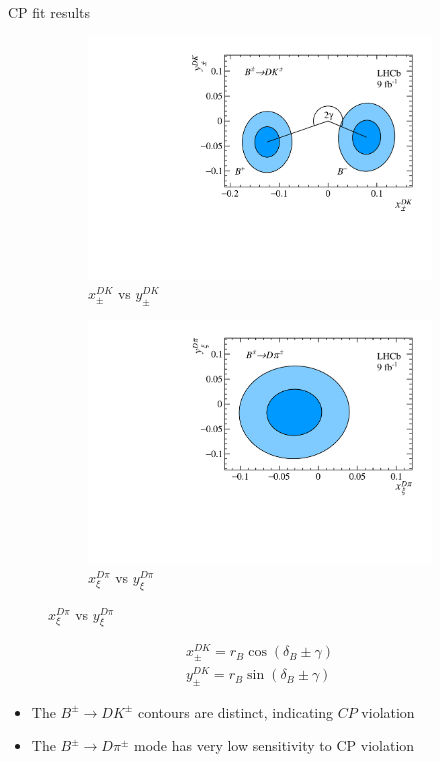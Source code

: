 \documentclass{beamer}
\begin{document}
\begin{frame}{CP fit results}
  \begin{figure}
    \centering
    \vspace{-0.2cm}
    \begin{subfigure}{0.5\textwidth}
      \includegraphics[width = 1.0\textwidth]{Plots/B2DK_CP_Observables_Contours.pdf}
      \caption{$x_\pm^{DK}$ vs $y_\pm^{DK}$}
    \end{subfigure}%
    \begin{subfigure}{0.5\textwidth}
      \includegraphics[width = 1.0\textwidth]{Plots/B2Dpi_CP_Observables_Contours.pdf}
      \caption{$x_\xi^{D\pi}$ vs $y_\xi^{D\pi}$}
    \end{subfigure}
  \end{figure}
  \vspace{-0.3cm}
  \begin{align*}
    x_\pm^{DK} = r_B\cos(\delta_B\pm\gamma) \\
    y_\pm^{DK} = r_B\sin(\delta_B\pm\gamma)
  \end{align*}
  \vspace{-0.5cm}
  \begin{itemize}
    \item{The $B^\pm\to DK^\pm$ contours are distinct, indicating $C\!P$ violation}
    \item{The $B^\pm\to D\pi^\pm$ mode has very low sensitivity to CP violation}
  \end{itemize}
\end{frame}
\end{document}
